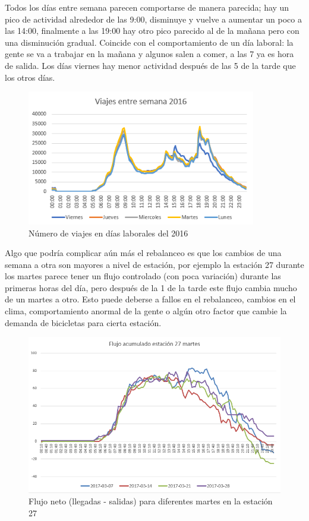 \documentclass[12pt,spanish]{article}
\begin{document}
	\pagebreak
	Todos los días entre semana parecen comportarse de manera parecida; hay un pico de actividad alrededor de las 9:00, disminuye y vuelve a aumentar un poco a las 14:00, finalmente a las 19:00 hay otro pico parecido al de la mañana pero con una disminución gradual. Coincide con el comportamiento de un día laboral: la gente se va a trabajar en la mañana y algunos salen a comer, a las 7 ya es hora de salida. Los días viernes hay menor actividad después de las 5 de la tarde que los otros días.
	\begin{figure}[H]
		\centering
		\includegraphics[width=10cm]{Imagenes/viajes_entre_semana_2016.png}
		\begin{centering}
		\caption{Número de viajes en días laborales del 2016}
		\end{centering}
	\end{figure}
	\pagebreak
	Algo que podría complicar aún más el rebalanceo es que los cambios de una semana a otra son mayores a nivel de estación, por ejemplo la estación 27 durante los martes parece tener un flujo controlado (con poca variación) durante las primeras horas del día, pero después de la 1 de la tarde este flujo cambia mucho de un martes a otro. Esto puede deberse a fallos en el rebalanceo, cambios en el clima, comportamiento anormal de la gente o algún otro factor que cambie la demanda de bicicletas para cierta estación.
	\begin{figure}[H]
		\centering
		\includegraphics[width=15cm]{Imagenes/27_martes_2.png}
		\begin{centering}
			\caption{Flujo neto (llegadas - salidas) para diferentes martes en la estación 27}
		\end{centering}
	\end{figure}
	\newpage
\end{document}

